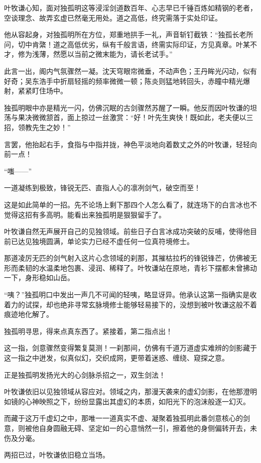 叶牧谦心知，面对独孤明这等浸淫剑道数百年、心志早已千锤百炼如精钢的老者，空谈理念、故弄玄虚已然毫无用处。道之高低，终究需落于实处印证。

他从容起身，对独孤明所在方位，郑重地拱手一礼，声音斩钉截铁：“独孤长老所问，切中肯綮！道之高低优劣，纵有千般言语，终需实际印证，方见真章。叶某不才，修为浅薄，然愿以当前之微末能为，请长老试手。”

此言一出，阁内气氛骤然一凝。沈天穹眼帘微垂，不动声色；王丹眸光闪动，似有好奇；吴东浩手中折扇轻摇的频率微微一顿；陈炎则猛地转回头，赤瞳中精光爆射，紧紧盯住场中。

独孤明眼中亦是精光一闪，仿佛沉眠的古剑骤然苏醒了一瞬。他反而因叶牧谦的坦荡与果决微微颔首，面上掠过一丝激赏：“好！叶先生爽快！既如此，老夫便以三招，领教先生之妙！”

言罢，他抬起右手，食指与中指并拢，神色平淡地向着数丈之外的叶牧谦，轻轻向前一点！

“嗤——”

一道凝练到极致，锋锐无匹、直指人心的凛冽剑气，破空而至！

这是如此简单的一招。先不论场上剩下那四个人怎么看了，就连场下的白言冰也不觉得这招有多高明。能看出来独孤明是狠狠留手了。

叶牧谦自然无声展开自己的见独领域。前些日子白言冰成功突破的反哺，使得他目前已达见独境圆满，单论实力已经不虚任何一位真符境修士。

那道凌厉无匹的剑气射入这片心念领域的刹那，其摧枯拉朽的锋锐锋芒，仿佛被无形而柔韧的水温柔地包裹、浸润、稀释了。叶牧谦站在原地，青衫下摆都未曾拂动一下，身形稳如山岳。

“咦？”独孤明口中发出一声几不可闻的轻咦，略显讶异。他承认这第一指确实是收着力的试探，却也绝非寻常玄脉境修士能够轻易接下的，没想到被叶牧谦这般不着痕迹地化解了。

独孤明寻思，得来点真东西了。紧接着，第二指点出！

这一指，剑意骤然变得繁复莫测！一刹那间，仿佛有千道万道虚实难辨的剑影藏于这一指之中迸发，似真似幻，交织成网，更带着迷惑、缠绕、窥探之意。

正是独孤明发扬光大的心剑脉杀招之一，双生剑法！

叶牧谦依旧以见独领域从容应对。领域之内，那漫天袭来的虚幻剑影，在他那澄明如镜的心神映照之下，纷纷显露出其虚幻的本质，如阳光下的泡沫般逐一幻灭。

而藏于这万千虚幻之中，那唯一一道真实不虚、凝聚着独孤明此番剑意核心的剑意，则被他自身圆融无碍、坚定如一的心意悄然一引，擦着他的身侧偏转开去，未伤及分毫。

两招已过，叶牧谦依旧稳立当场。

